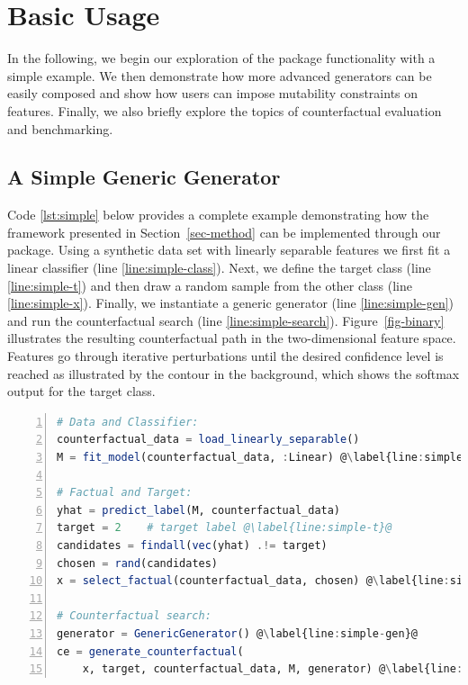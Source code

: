 \documentclass{juliacon}
\begin{document}
\section{Basic Usage}\label{sec-use}

In the following, we begin our exploration of the package functionality
with a simple example. We then demonstrate how more advanced generators
can be easily composed and show how users can impose mutability
constraints on features. Finally, we also briefly explore the topics of
counterfactual evaluation and benchmarking.

\subsection{A Simple Generic Generator}\label{sec-simple}

Code \ref{lst:simple} below provides a complete example demonstrating
how the framework presented in Section~\ref{sec-method} can be
implemented through our package. Using a synthetic data set with
linearly separable features we first fit a linear classifier (line
\ref{line:simple-class}). Next, we define the target class (line
\ref{line:simple-t}) and then draw a random sample from the other class
(line \ref{line:simple-x}). Finally, we instantiate a generic generator
(line \ref{line:simple-gen}) and run the counterfactual search (line
\ref{line:simple-search}). Figure~\ref{fig-binary} illustrates the
resulting counterfactual path in the two-dimensional feature space.
Features go through iterative perturbations until the desired confidence
level is reached as illustrated by the contour in the background, which
shows the softmax output for the target class.

\begin{lstlisting}[language=Julia, escapechar=@, numbers=left, label={lst:simple}, caption={Standard workflow for generating counterfactuals.}] 
# Data and Classifier:
counterfactual_data = load_linearly_separable()
M = fit_model(counterfactual_data, :Linear) @\label{line:simple-class}@

# Factual and Target:
yhat = predict_label(M, counterfactual_data)
target = 2    # target label @\label{line:simple-t}@
candidates = findall(vec(yhat) .!= target)
chosen = rand(candidates)
x = select_factual(counterfactual_data, chosen) @\label{line:simple-x}@

# Counterfactual search:
generator = GenericGenerator() @\label{line:simple-gen}@
ce = generate_counterfactual(
    x, target, counterfactual_data, M, generator) @\label{line:simple-search}@
\end{lstlisting}
\end{document}
